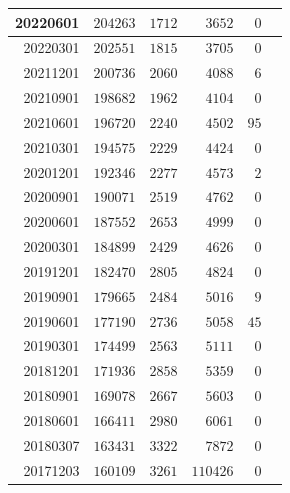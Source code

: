 \documentclass[hidelinks,a4paper,12pt]{article}
\begin{document}
\begin{longtable}{|r|r|r|r|r|r|}
20220601         & $204263$         & $1712$         & $3652$           & $0$              \\ \hline
20220301         & $202551$         & $1815$         & $3705$           & $0$              \\ \hline
20211201         & $200736$         & $2060$         & $4088$           & $6$              \\ \hline
20210901         & $198682$         & $1962$         & $4104$           & $0$              \\ \hline
20210601         & $196720$         & $2240$         & $4502$           & $95$             \\ \hline
20210301         & $194575$         & $2229$         & $4424$           & $0$              \\ \hline
20201201         & $192346$         & $2277$         & $4573$           & $2$              \\ \hline
20200901         & $190071$         & $2519$         & $4762$           & $0$              \\ \hline
20200601         & $187552$         & $2653$         & $4999$           & $0$              \\ \hline
20200301         & $184899$         & $2429$         & $4626$           & $0$              \\ \hline
20191201         & $182470$         & $2805$         & $4824$           & $0$              \\ \hline
20190901         & $179665$         & $2484$         & $5016$           & $9$              \\ \hline
20190601         & $177190$         & $2736$         & $5058$           & $45$             \\ \hline
20190301         & $174499$         & $2563$         & $5111$           & $0$              \\ \hline
20181201         & $171936$         & $2858$         & $5359$           & $0$              \\ \hline
20180901         & $169078$         & $2667$         & $5603$           & $0$              \\ \hline
20180601         & $166411$         & $2980$         & $6061$           & $0$              \\ \hline
20180307         & $163431$         & $3322$         & $7872$           & $0$              \\ \hline
20171203         & $160109$         & $3261$         & $110426$         & $0$              \\ \hline

\end{longtable}
\end{document}
